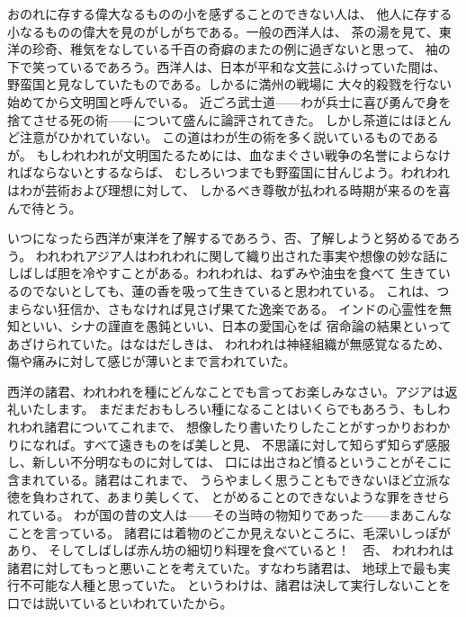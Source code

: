 \documentclass[a4paper, platex, dvipdfmx]{jsarticle}
\begin{document}
おのれに存する偉大なるものの小を感ずることのできない人は、
他人に存する小なるものの偉大を見のがしがちである。一般の西洋人は、
茶の湯を見て、東洋の珍奇、稚気をなしている千百の奇癖のまたの例に過ぎないと思って、
袖の下で笑っているであろう。西洋人は、日本が平和な文芸にふけっていた間は、
野蛮国と見なしていたものである。しかるに満州の戦場に
大々的殺戮を行ない始めてから文明国と呼んでいる。
近ごろ武士道——わが兵士に喜び勇んで身を捨てさせる死の術——について盛んに論評されてきた。
しかし茶道にはほとんど注意がひかれていない。
この道はわが生の術を多く説いているものであるが。
もしわれわれが文明国たるためには、血なまぐさい戦争の名誉によらなければならないとするならば、
むしろいつまでも野蛮国に甘んじよう。われわれはわが芸術および理想に対して、
しかるべき尊敬が払われる時期が来るのを喜んで待とう。

いつになったら西洋が東洋を了解するであろう、否、了解しようと努めるであろう。
われわれアジア人はわれわれに関して織り出された事実や想像の妙な話に
しばしば胆を冷やすことがある。われわれは、ねずみや油虫を食べて
生きているのでないとしても、蓮の香を吸って生きていると思われている。
これは、つまらない狂信か、さもなければ見さげ果てた逸楽である。
インドの心霊性を無知といい、シナの謹直を愚鈍といい、日本の愛国心をば
宿命論の結果といってあざけられていた。はなはだしきは、
われわれは神経組織が無感覚なるため、傷や痛みに対して感じが薄いとまで言われていた。

西洋の諸君、われわれを種にどんなことでも言ってお楽しみなさい。アジアは返礼いたします。
まだまだおもしろい種になることはいくらでもあろう、もしわれわれ諸君についてこれまで、
想像したり書いたりしたことがすっかりおわかりになれば。すべて遠きものをば美しと見、
不思議に対して知らず知らず感服し、新しい不分明なものに対しては、
口には出さねど憤るということがそこに含まれている。諸君はこれまで、
うらやましく思うこともできないほど立派な徳を負わされて、あまり美しくて、
とがめることのできないような罪をきせられている。
わが国の昔の文人は——その当時の物知りであった——まあこんなことを言っている。
諸君には着物のどこか見えないところに、毛深いしっぽがあり、
そしてしばしば赤ん坊の細切り料理を食べていると！　否、
われわれは諸君に対してもっと悪いことを考えていた。すなわち諸君は、
地球上で最も実行不可能な人種と思っていた。
というわけは、諸君は決して実行しないことを口では説いているといわれていたから。
\end{document}
